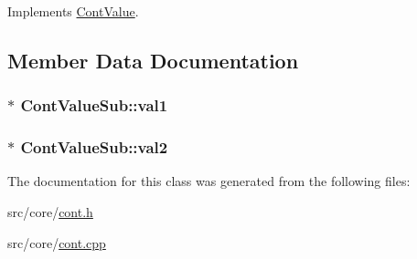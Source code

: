 Implements \hyperlink{a00086_ae3ce98084899bf1a873a1ec6bf15116e}{Cont\-Value}.



\subsection{Member Data Documentation}
\hypertarget{a00094_aea7fcfb875bc2b48349c5623c827e462}{
\subsubsection[{val1}]{$\ast$ Cont\-Value\-Sub\-::val1\hspace{0.3cm}{\ttfamily [private]}}}\label{a00094_aea7fcfb875bc2b48349c5623c827e462}
\hypertarget{a00094_a8fb20f6acd76c1cfcbda98871e80dc31}{
\subsubsection[{val2}]{ $\ast$ Cont\-Value\-Sub\-::val2\hspace{0.3cm}{\ttfamily [private]}}}\label{a00094_a8fb20f6acd76c1cfcbda98871e80dc31}


The documentation for this class was generated from the following files\-:\begin{DoxyCompactItemize}
\item 
src/core/\hyperlink{a00218}{cont.\-h}\item 
src/core/\hyperlink{a00217}{cont.\-cpp}\end{DoxyCompactItemize}
